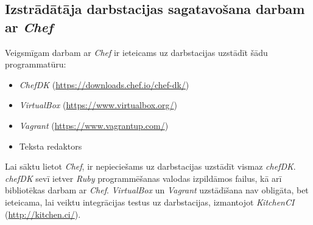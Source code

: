 \subsection{Izstrādātāja darbstacijas sagatavošana darbam ar \textit{Chef}} \label{ChefDarbstacija}
Veigsmīgam darbam ar \textit{Chef} ir ieteicams uz darbstacijas uzstādīt šādu programmatūru:
\begin{itemize}
	\item \textit{ChefDK} (\url{https://downloads.chef.io/chef-dk/})
	\item \textit{VirtualBox} (\url{https://www.virtualbox.org/})
  \item \textit{Vagrant} (\url{https://www.vagrantup.com/})
  \item Teksta redaktors
\end{itemize}
Lai sāktu lietot \textit{Chef}, ir nepieciešams uz darbstacijas uzstādīt vismaz \textit{chefDK}. \textit{chefDK} sevī ietver \textit{Ruby} programmēšanas valodas izpildāmos failus, kā arī bibliotēkas darbam ar \textit{Chef}.
\textit{VirtualBox} un \textit{Vagrant} uzstādīšana nav obligāta, bet ieteicama, lai veiktu integrācijas testus uz darbstacijas, izmantojot \textit{KitchenCI} (\url{http://kitchen.ci/}).
%

